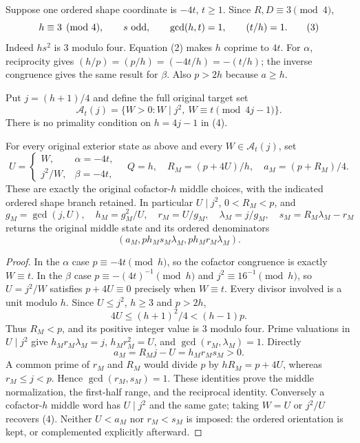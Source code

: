 Suppose one ordered shape coordinate is $-4t$, $t\ge1$. Since $R,D\equiv3\pmod4$,
\[
 h\equiv3\pmod4,\qquad s\ \hbox{odd},\qquad
 \gcd(h,t)=1,\qquad (t/h)=1.                             \tag{3}
\]
Indeed $hs^2$ is 3 modulo four. Equation (2) makes $h$ coprime to $4t$.
For $\alpha$, reciprocity gives $(h/p)=(p/h)=(-4t/h)=-(t/h)$; the inverse
congruence gives the same result for $\beta$. Also $p>2h$ because $a\ge h$.

Put $j=(h+1)/4$ and define the full original target set
\[
 \boxed{\mathcal A_t(j)=\{W>0:W\mid j^2,\ W\equiv t\pmod{4j-1}\}.}       \tag{4}
\]
There is no primality condition on $h=4j-1$ in (4).

\begin{theorem}\label{thm:return}
For every original exterior state as above and every $W\in\mathcal A_t(j)$, set
\[
 U=\begin{cases}W,&\alpha=-4t,\\j^2/W,&\beta=-4t,\end{cases}
 \quad Q=h,\quad R_M=(p+4U)/h,\quad a_M=(p+R_M)/4.          \tag{5}
\]
These are exactly the original cofactor-$h$ middle choices, with the indicated
ordered shape branch retained. In particular $U\mid j^2$, $0<R_M<p$, and
\[
 g_M=\gcd(j,U),\quad
 h_M=g_M^2/U,\quad r_M=U/g_M,\quad\lambda_M=j/g_M,
 \quad s_M=R_M\lambda_M-r_M                              \tag{6}
\]
returns the original middle state and its ordered denominators
\[
 (a_M,ph_Ms_M\lambda_M,ph_Mr_M\lambda_M).
\]
\end{theorem}
\begin{proof}
In the $\alpha$ case $p\equiv-4t\pmod h$, so the cofactor congruence is exactly
$W\equiv t$. In the $\beta$ case $p\equiv-(4t)^{-1}\pmod h$ and
$j^2\equiv16^{-1}\pmod h$, so $U=j^2/W$ satisfies $p+4U\equiv0$ precisely
when $W\equiv t$. Every divisor involved is a unit modulo $h$.
Since $U\le j^2$, $h\ge3$ and $p>2h$,
\[
 4U\le(h+1)^2/4<(h-1)p.
\]
Thus $R_M<p$, and its positive integer value is 3 modulo four. Prime valuations
in $U\mid j^2$ give $h_Mr_M\lambda_M=j$, $h_Mr_M^2=U$, and
$\gcd(r_M,\lambda_M)=1$. Directly
\[
 a_M=R_Mj-U=h_Mr_Ms_M>0.
\]
A common prime of $r_M$ and $R_M$ would divide $p$ by $hR_M=p+4U$, whereas
$r_M\le j<p$. Hence $\gcd(r_M,s_M)=1$. These identities prove the middle
normalization, the first-half range, and the reciprocal identity. Conversely a
cofactor-$h$ middle word has $U\mid j^2$ and the same gate; taking $W=U$ or
$j^2/U$ recovers (4). Neither $U<a_M$ nor $r_M<s_M$ is imposed: the ordered
orientation is kept, or complemented explicitly afterward.
\end{proof}

